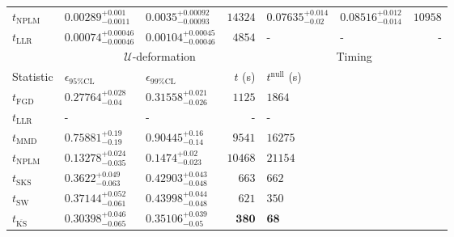 \begin{tabular}{l|llr|llr}
\rowcolor{red!35}	$t_{\mathrm{NPLM}}$ & $0.00289_{-0.0011}^{+0.001}$ & $0.0035_{-0.00093}^{+0.00092}$ & $14324$ & $0.07635_{-0.02}^{+0.014}$ & $0.08516_{-0.014}^{+0.012}$ & $10958$ \\
	$t_{\mathrm{LLR}}$ & $0.00074_{-0.00046}^{+0.00046}$ & $0.00104_{-0.00046}^{+0.00045}$ & $4854$ & - & - & - \\
	\toprule
	\multicolumn{1}{c}{} & \multicolumn{3}{c}{$\mathcal{U}$-deformation} & \multicolumn{3}{c}{Timing} \\
	Statistic & $\epsilon_{95\%\mathrm{CL}}$ & $\epsilon_{99\%\mathrm{CL}}$ & $t$ (s) & $t^{\mathrm{null}}$ (s) \\
	\midrule
	$t_{\mathrm{FGD}}$ & ${\mathbf{0.27764_{-0.04}^{+0.028}}}$ & ${\mathbf{0.31558_{-0.026}^{+0.021}}}$ & $1125$ & $1864$ \\
	$t_{\mathrm{LLR}}$ & - & - & - & - \\
	$t_{\mathrm{MMD}}$ & $0.75881_{-0.19}^{+0.19}$ & $0.90445_{-0.14}^{+0.16}$ & $9541$ & $16275$ \\
\rowcolor{red!35}	$t_{\mathrm{NPLM}}$ & $0.13278_{-0.035}^{+0.024}$ & $0.1474_{-0.023}^{+0.02}$ & $10468$ & $21154$ \\
	$t_{\mathrm{SKS}}$ & $0.3622_{-0.063}^{+0.049}$ & $0.42903_{-0.048}^{+0.043}$ & $663$ & $662$ \\
	$t_{\mathrm{SW}}$ & $0.37144_{-0.061}^{+0.052}$ & $0.43998_{-0.048}^{+0.044}$ & $621$ & $350$ \\
	$t_{\overline{\mathrm{KS}}}$ & $0.30398_{-0.065}^{+0.046}$ & $0.35106_{-0.05}^{+0.039}$ & ${\mathbf{380}}$ & ${\mathbf{68}}$ \\
	\bottomrule
\end{tabular}